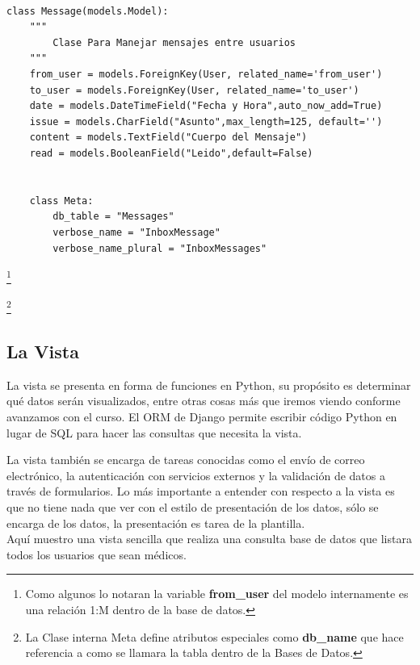 \begin{lstlisting}[style=Python]

class Message(models.Model):
    """
        Clase Para Manejar mensajes entre usuarios
    """
    from_user = models.ForeignKey(User, related_name='from_user')
    to_user = models.ForeignKey(User, related_name='to_user')
    date = models.DateTimeField("Fecha y Hora",auto_now_add=True)
    issue = models.CharField("Asunto",max_length=125, default='')
    content = models.TextField("Cuerpo del Mensaje")
    read = models.BooleanField("Leido",default=False)


    class Meta:
        db_table = "Messages"
        verbose_name = "InboxMessage"
        verbose_name_plural = "InboxMessages"
\end{lstlisting}

\footnote{Como algunos lo notaran la variable \textbf{from\_user} del modelo internamente es una relación 1:M dentro de la base de datos.}

\footnote{La Clase interna Meta define atributos especiales como \textbf{db\_name} que hace referencia a como se llamara la tabla dentro de la Bases de Datos.}

\vspace{0.1cm}

\subsection{La Vista}
La vista se presenta en forma de funciones en Python, su propósito es determinar qué datos serán visualizados, entre otras cosas más que iremos viendo conforme avanzamos con el curso. El ORM de Django permite escribir código Python en lugar de SQL para hacer las consultas que necesita la vista.

La vista también se encarga de tareas conocidas como el enví­o de correo electrónico, la autenticación con servicios externos y la validación de datos a través de formularios. Lo más importante a entender con respecto  a la  vista es que no tiene nada que ver con el estilo de presentación de los  datos, sólo se encarga de los datos, la presentación es tarea de la plantilla.\\[0.1cm]


Aquí muestro una vista sencilla que realiza una consulta base de datos que listara todos los usuarios que sean médicos. \\[0.1cm]

